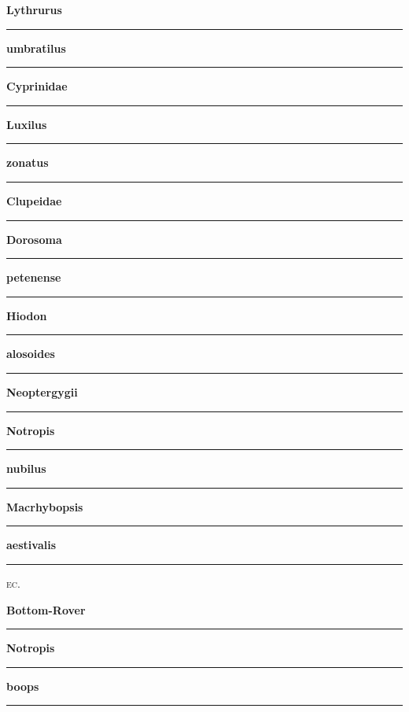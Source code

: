 \documentclass[11pt]{exam}
\newcommand*\Matching[1]{
\ifprintanswers
	\textbf{#1}
\else
	\rule{2.1in}{0.4pt}
\fi
}
\newlength\matchlena
\newlength\matchlenb
\newcommand\MatchQuestion[2]{%
	\setlength\matchlenb{\linewidth}
	\addtolength\matchlenb{-\matchlena}
	\parbox[t]{\matchlena}{\Matching{#1}}\enspace\parbox[t]{\matchlenb}{#2}}
\newlength\eclength
\newcommand*\ECQuestion[2]{%
	\setlength\matchlenb{\linewidth}
	\addtolength\matchlenb{-\eclength}
	\hspace{-0.24in}\textsc{ec}.\enspace\parbox[t]{\eclength}{\Matching{#1}}\enspace\parbox[t]{\matchlenb}{#2}}
\begin{document}
\begin{questions}
\begin{multicols}{2}
\question\MatchQuestion{Lythrurus}{}
\vspace{1.5\baselineskip}

\question\MatchQuestion{umbratilus}{}
\vspace{1.5\baselineskip}

\question\MatchQuestion{Cyprinidae}{}
\vspace{1.5\baselineskip}

\question\MatchQuestion{Luxilus}{}
\vspace{1.5\baselineskip}

\question\MatchQuestion{zonatus}{}
\vspace{1.5\baselineskip}

\question\MatchQuestion{Clupeidae}{}
\vspace{1.5\baselineskip}

\question\MatchQuestion{Dorosoma}{}
\vspace{1.5\baselineskip}

\question\MatchQuestion{petenense}{}
\vspace{1.5\baselineskip}

\question\MatchQuestion{Hiodon}{}
\vspace{1.5\baselineskip}

\question\MatchQuestion{alosoides}{}

\question\MatchQuestion{Neoptergygii}{}
\vspace{1.5\baselineskip}

\question\MatchQuestion{Notropis}{}
\vspace{1.5\baselineskip}

\question\MatchQuestion{nubilus}{}
\vspace{1.5\baselineskip}

\question\MatchQuestion{Macrhybopsis}{}
\vspace{1.5\baselineskip}

\question\MatchQuestion{aestivalis}{}
\vspace{1.5\baselineskip}

\ECQuestion{Bottom-Rover}{}
\vspace{1.5\baselineskip}

\question\MatchQuestion{Notropis}{}
\vspace{1.5\baselineskip}

\question\MatchQuestion{boops}{}
\vspace{1.5\baselineskip}


\end{multicols}
\end{questions}
\end{document}

